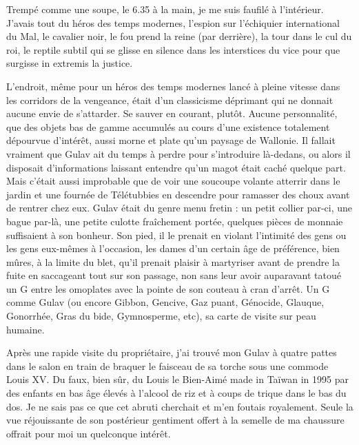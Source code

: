 Trempé comme une soupe, le 6.35 à la main, je me suis faufilé à l’intérieur. J’avais tout du héros des temps modernes, l’espion sur l’échiquier international du Mal, le cavalier noir, le fou prend la reine (par derrière), la tour dans le cul du roi, le reptile subtil qui se glisse en silence dans les interstices du vice pour que surgisse in extremis la justice.

L’endroit, même pour un héros des temps modernes lancé à pleine vitesse dans les corridors de la vengeance, était d’un classicisme déprimant qui ne donnait aucune envie de s’attarder. Se sauver en courant, plutôt. Aucune personnalité, que des objets bas de gamme accumulés au cours d’une existence totalement dépourvue d’intérêt, aussi morne et plate qu’un paysage de Wallonie. Il fallait vraiment que Gulav ait du temps à perdre pour s’introduire là-dedans, ou alors il disposait d’informations laissant entendre qu’un magot était caché quelque part. Mais c’était aussi improbable que de voir une soucoupe volante atterrir dans le jardin et une fournée de Télétubbies en descendre pour ramasser des choux avant de rentrer chez eux. Gulav était du genre menu fretin : un petit collier par-ci, une bague par-là, une petite culotte fraîchement portée, quelques pièces de monnaie suffisaient à son bonheur. Son pied, il le prenait en violant l’intimité des gens ou les gens eux-mêmes à l’occasion, les dames d’un certain âge de préférence, bien mûres, à la limite du blet, qu’il prenait plaisir à martyriser avant de prendre la fuite en saccageant tout sur son passage, non sans leur avoir auparavant tatoué un G entre les omoplates avec la pointe de son couteau à cran d’arrêt. Un G comme Gulav (ou encore Gibbon, Gencive, Gaz puant, Génocide, Glauque, Gonorrhée, Gras du bide, Gymnosperme, etc), sa carte de visite sur peau humaine.
%
%

Après une rapide visite du propriétaire, j’ai trouvé mon Gulav à quatre pattes dans le salon en train de braquer le faisceau de sa torche sous une commode Louis XV. Du faux, bien sûr, du Louis le Bien-Aimé made in Taïwan in 1995 par des enfants en bas âge élevés à l’alcool de riz et à coups de trique dans le bas du dos. Je ne sais pas ce que cet abruti cherchait et m’en foutais royalement. Seule la vue réjouissante de son postérieur gentiment offert à la semelle de ma chaussure offrait pour moi un quelconque intérêt.

